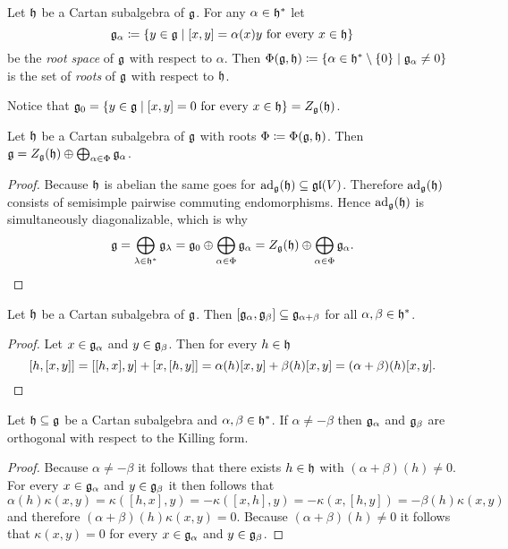 

\begin{definition}
 Let $\mathfrak{h}$ be a Cartan subalgebra of $\mathfrak{g}$. For any $\alpha \in \mathfrak{h}^*$ let
 \[
  \mathfrak{g}_\alpha \coloneqq \{y \in \mathfrak{g} \mid \text{$[x,y] = \alpha(x)y$ for every $x \in \mathfrak{h}$}\}
 \]
 be the \emph{root space} of $\mathfrak{g}$ with respect to $\alpha$. Then $\Phi(\mathfrak{g}, \mathfrak{h}) \coloneqq \{\alpha \in \mathfrak{h}^* \setminus \{0\} \mid \mathfrak{g}_\alpha \neq 0\}$ is the set of \emph{roots} of $\mathfrak{g}$ with respect to $\mathfrak{h}$.
\end{definition}


\begin{remark}
 Notice that $\mathfrak{g}_0 = \{y \in \mathfrak{g} \mid \text{$[x,y] = 0$ for every $x \in \mathfrak{h}$}\} = Z_{\mathfrak{g}}(\mathfrak{h})$.
\end{remark}



\begin{lemma}
 Let $\mathfrak{h}$ be a Cartan subalgebra of $\mathfrak{g}$ with roots $\Phi \coloneqq \Phi(\mathfrak{g}, \mathfrak{h})$. Then $\mathfrak{g} = Z_{\mathfrak{g}}(\mathfrak{h}) \oplus \bigoplus_{\alpha \in \Phi} \mathfrak{g}_\alpha$.
\end{lemma}
\begin{proof}
 Because $\mathfrak{h}$ is abelian the same goes for $\operatorname{ad}_{\mathfrak{g}}(\mathfrak{h}) \subseteq \mathfrak{gl}(V)$. Therefore $\operatorname{ad}_{\mathfrak{g}}(\mathfrak{h})$ consists of semisimple pairwise commuting endomorphisms. Hence $\operatorname{ad}_{\mathfrak{g}}(\mathfrak{h})$ is simultaneously diagonalizable, which is why
 \[
  \mathfrak{g}
  = \bigoplus_{\lambda \in \mathfrak{h}^*} \mathfrak{g}_\lambda
  = \mathfrak{g}_0 \oplus \bigoplus_{\alpha \in \Phi} \mathfrak{g}_\alpha
  = Z_{\mathfrak{g}}(\mathfrak{h}) \oplus \bigoplus_{\alpha \in \Phi} \mathfrak{g}_\alpha.
  \qedhere
 \]
\end{proof}




\begin{lemma}
 Let $\mathfrak{h}$ be a Cartan subalgebra of $\mathfrak{g}$. Then $[\mathfrak{g}_\alpha, \mathfrak{g}_\beta] \subseteq \mathfrak{g}_{\alpha+\beta}$ for all $\alpha, \beta \in \mathfrak{h}^*$.
\end{lemma}
\begin{proof}
 Let $x \in \mathfrak{g}_\alpha$ and $y \in \mathfrak{g}_\beta$. Then for every $h \in \mathfrak{h}$
 \[
  [h,[x,y]]
  = [[h,x],y] + [x,[h,y]]
  = \alpha(h)[x,y] + \beta(h)[x,y]
  = (\alpha+\beta)(h) [x,y].
  \qedhere
 \]
\end{proof}


\begin{lemma}\label{lem: root spaces orthogonal with respect to the Killing form}
Let $\mathfrak{h} \subseteq \mathfrak{g}$ be a Cartan subalgebra and $\alpha, \beta \in \mathfrak{h}^*$. If $\alpha \neq -\beta$ then $\mathfrak{g}_\alpha$ and $\mathfrak{g}_\beta$ are orthogonal with respect to the Killing form.
\end{lemma}
\begin{proof}
 Because $\alpha \neq -\beta$ it follows that there exists $h \in \mathfrak{h}$ with $(\alpha+\beta)(h) \neq 0$. For every $x \in \mathfrak{g}_\alpha$ and $y \in \mathfrak{g}_\beta$ it then follows that
 \[
  \alpha(h) \kappa(x,y)
  = \kappa([h,x],y)
  = -\kappa([x,h],y)
  = -\kappa(x,[h,y])
  = -\beta(h)\kappa(x,y)
 \]
 and therefore $(\alpha+\beta)(h)\kappa(x,y) = 0$. Because $(\alpha+\beta)(h) \neq 0$ it follows that $\kappa(x,y) = 0$ for every $x \in \mathfrak{g}_\alpha$ and $y \in \mathfrak{g}_\beta$.
\end{proof}


